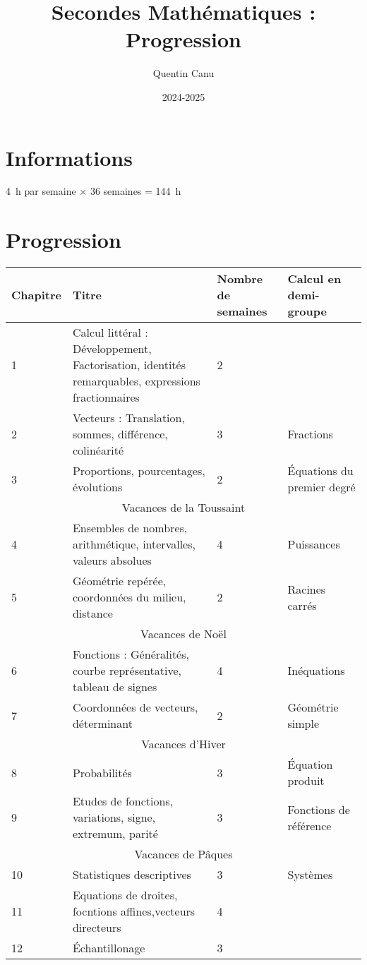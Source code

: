 \documentclass{article}
\title{Secondes Mathématiques : Progression}
\author{Quentin Canu}
\date{2024-2025}
\begin{document}
\maketitle

\section{Informations}

\qty{4}{\hour} par semaine $\times$ 36 semaines = \qty{144}{\hour}

\section{Progression}

\begin{center}
    
\begin{tabular}{|l|p{4cm}|p{2cm}|p{2cm}|}
\hline
Chapitre
    & 
Titre
        & 
Nombre de semaines
            &
Calcul en demi-groupe\\
\hline
1   & 
Calcul littéral : Développement, Factorisation, identités remarquables, expressions fractionnaires
        &
2
            &
\\
\hline
2   &
Vecteurs : Translation, sommes, différence, colinéarité 
        &
3
            &
Fractions\\
\hline
3   &
Proportions, pourcentages, évolutions
        &
2
            &
Équations du premier degré\\
\hline
\multicolumn{4}{|c|}{Vacances de la Toussaint}\\
\hline
4   &
Ensembles de nombres, arithmétique, intervalles, valeurs absolues
        &
4
            &
Puissances\\
\hline
5   &
Géométrie repérée, coordonnées du milieu, distance
        &
2
            &
Racines carrés\\
\hline
\multicolumn{4}{|c|}{Vacances de Noël}\\
\hline
6   &
Fonctions : Généralités, courbe représentative, tableau de signes
        &
4
            &
Inéquations\\
\hline
7   &
Coordonnées de vecteurs, déterminant
        &
2
            &
Géométrie simple\\
\hline
\multicolumn{4}{|c|}{Vacances d'Hiver}\\
\hline
8   &
Probabilités
        &
3
            &
Équation produit\\
\hline
9   &
Etudes de fonctions, variations, signe, extremum, parité
        &
3
            &
Fonctions de référence\\
\hline
\multicolumn{4}{|c|}{Vacances de Pâques}\\
\hline
10  &
Statistiques descriptives
        &
3
            &
Systèmes\\
\hline
11  &
Equations de droites, focntions affines,vecteurs directeurs
        &
4
            &
\\
\hline
12  &
Échantillonage
        &
3
            &
\\
\hline
\end{tabular}
\end{center}
\end{document}
